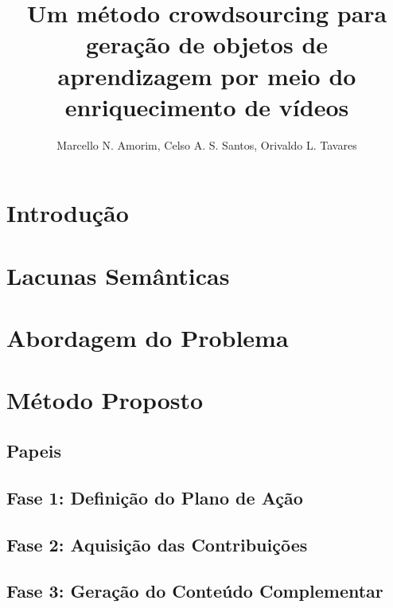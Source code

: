 \documentclass[12pt]{article}
\title{Um método crowdsourcing para geração de objetos de aprendizagem por meio do enriquecimento de vídeos}
\author{Marcello N. Amorim\inst{1}, Celso A. S. Santos\inst{2}, Orivaldo L. Tavares\inst{3} }
\begin{document}
 

\maketitle

\begin{abstract}

\end{abstract}
     
\begin{resumo} 

\end{resumo}

\pagebreak

\section{Introdução}


\section{Lacunas Semânticas}


\section{Abordagem do Problema}


\section{Método Proposto}


\subsection{Papeis}


\subsection{Fase 1: Definição do Plano de Ação}


\subsection{Fase 2: Aquisição das Contribuições}


\subsection{Fase 3: Geração do Conteúdo Complementar}

\end{document}
